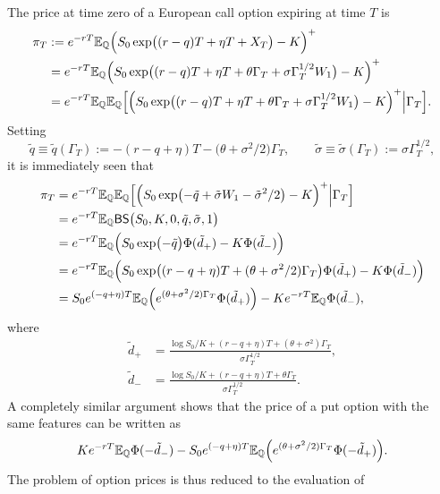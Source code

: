 \documentclass[11pt]{article}
\theoremstyle{remark}
\newcommand{\E}{\mathbb{E}}
\newcommand{\Q}{\mathbb{Q}}
\begin{document}
The price at time zero of a European call option expiring at time $T$
is
\begin{align*}
  \pi_T &:= e^{-rT} \E_\Q\Bigl( S_0 \exp \bigl(
        (r-q)T + \eta T + X_T \bigr) - K \Bigr)^+\\
        &= e^{-rT} \E_\Q\Bigl( S_0 \exp \bigl(
        (r-q)T + \eta T + \theta\Gamma_T + \sigma \Gamma_T^{1/2}W_1 \bigr) 
        - K \Bigr)^+\\
        &= e^{-rT} \E_\Q\E_\Q\Bigr[\Bigl( S_0 \exp \bigl(
        (r-q)T + \eta T + \theta\Gamma_T + \sigma \Gamma_T^{1/2}W_1 \bigr) 
        - K \Bigr)^+ \Big\vert \Gamma_T \Bigr].
\end{align*}
Setting
\[
\tilde{q} \equiv \tilde{q}(\Gamma_T) := - (r-q+\eta)T 
- \bigl( \theta + \sigma^2/2 \bigr) \Gamma_T,
\qquad
\tilde{\sigma} \equiv \tilde{\sigma}(\Gamma_T) := \sigma \Gamma_T^{1/2},
\]
it is immediately seen that
\begin{align*}
  \pi_T &= e^{-rT} \E_\Q\E_\Q\Bigr[\Bigl( S_0 \exp \bigl(
        - \tilde{q} + \tilde{\sigma} W_1 - \tilde{\sigma}^2/2 \bigr) 
        - K \Bigr)^+ \Big\vert \Gamma_T \Bigr]\\
        &= e^{-rT} \E_\Q \mathsf{BS}\bigl(S_0,K,0,\tilde{q},\tilde{\sigma},1
                        \bigr)\\
        &= e^{-rT} \E_\Q \Bigl( S_0 \exp\bigl( -\tilde{q} \bigr)
           \Phi(\tilde{d}_+) - K \Phi(\tilde{d}_-) \Bigr)\\
        &= e^{-rT} \E_\Q \Bigl( S_0 \exp\bigl( 
                  (r - q + \eta)T + (\theta+\sigma^2/2) \Gamma_T \bigr)
           \Phi(\tilde{d}_+) - K \Phi(\tilde{d}_-) \Bigr)\\
        &= S_0 e^{(-q+\eta)T} \E_\Q\Bigl( 
           e^{(\theta+\sigma^2/2) \Gamma_T} \Phi(\tilde{d}_+) \Bigr)
           -K e^{-rT} \E_\Q \Phi(\tilde{d}_-),
\end{align*}
where
\begin{align*}
\tilde{d}_+ &= \frac{\log S_0/K + (r-q+\eta)T + (\theta+\sigma^2)\Gamma_T}%
                   {\sigma\Gamma_T^{1/2}},\\
\tilde{d}_- &= \frac{\log S_0/K + (r-q+\eta)T + \theta \Gamma_T}%
                   {\sigma\Gamma_T^{1/2}}.
\end{align*}
A completely similar argument shows that the price of a put option
with the same features can be written as
\[
K e^{-rT} \E_\Q \Phi(-\tilde{d}_-) - S_0 e^{(-q+\eta)T}
\E_\Q\Bigl( e^{(\theta+\sigma^2/2) \Gamma_T} \Phi(-\tilde{d}_+) \Bigr).
\]
%
The problem of option prices is thus reduced to the evaluation of
\end{document}

